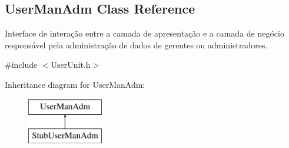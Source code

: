 \hypertarget{classUserManAdm}{\subsection{User\-Man\-Adm Class Reference}
\label{da/d86/classUserManAdm}
}


Interface de interação entre a camada de apresentação e a camada de negócio responsável pela administração de dados de gerentes ou administradores.  




{\ttfamily \#include $<$User\-Unit.\-h$>$}

Inheritance diagram for User\-Man\-Adm\-:\begin{figure}[H]
\begin{center}
\leavevmode
\includegraphics[height=2.000000cm]{da/d86/classUserManAdm}
\end{center}
\end{figure}
